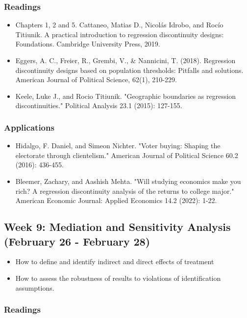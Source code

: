 \documentclass[11pt, article, oneside]{memoir}
\theoremstyle{Assumption}
\begin{document}
\subsubsection*{Readings}

\begin{itemize}
\item Chapters 1, 2 and 5. Cattaneo, Matias D., Nicolás Idrobo, and Rocío Titiunik. A practical introduction to regression discontinuity designs: Foundations. Cambridge University Press, 2019.
\item Eggers, A. C., Freier, R., Grembi, V., \& Nannicini, T. (2018). Regression discontinuity designs based on population thresholds: Pitfalls and solutions. American Journal of Political Science, 62(1), 210-229.
\item Keele, Luke J., and Rocio Titiunik. "Geographic boundaries as regression discontinuities." Political Analysis 23.1 (2015): 127-155.
\end{itemize}

\subsubsection*{Applications}

\begin{itemize}
\item Hidalgo, F. Daniel, and Simeon Nichter. "Voter buying: Shaping the electorate through clientelism." American Journal of Political Science 60.2 (2016): 436-455.
\item Bleemer, Zachary, and Aashish Mehta. "Will studying economics make you rich? A regression discontinuity analysis of the returns to college major." American Economic Journal: Applied Economics 14.2 (2022): 1-22.
\end{itemize}

\subsection{Week 9: Mediation and Sensitivity Analysis (February 26 - February 28)}

\begin{itemize}
\item How to define and identify indirect and direct effects of treatment
\item How to assess the robustness of results to violations of identification assumptions. 
\end{itemize}

\subsubsection*{Readings}
\end{document}
